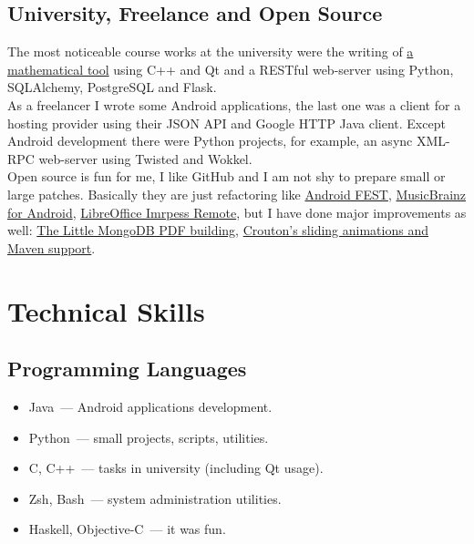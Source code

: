     \subsection*{University, Freelance and Open Source}

      The most noticeable course works at the university were the writing of
      \href{https://github.com/ming13/aequatio}{a mathematical tool}
      using C++ and Qt and a RESTful web-server using Python,
      SQLAlchemy, PostgreSQL and Flask. \\

      As a freelancer I wrote some Android applications, the last one was
      a client for a hosting provider using their JSON API
      and Google HTTP Java client.
      Except Android development there were Python projects, for example,
      an async XML-RPC web-server using Twisted and Wokkel. \\

      Open source is fun for me, I like GitHub and I am not shy to prepare
      small or large patches. Basically they are just refactoring like
      \href{https://github.com/square/fest-android/commits?author=ming13}{Android FEST},
      \href{https://github.com/jdamcd/musicbrainz-android/commits?author=ming13}{MusicBrainz for Android},
      \href{https://gerrit.libreoffice.org/#/q/owner:%22Artur+Dryomov%22+status:closed,n,z}{LibreOffice Imrpess Remote},
      but I have done major improvements as well:
      \href{https://github.com/karlseguin/the-little-mongodb-book/pull/16}{The Little MongoDB PDF building},
      \href{https://github.com/keyboardsurfer/Crouton/pulls/ming13?state=closed}{Crouton’s sliding animations and Maven support}.


  \section*{Technical Skills}

    \subsection*{Programming Languages}

      \begin{itemize}

        \item Java~--- Android applications development.

        \item Python~--- small projects, scripts, utilities.

        \item C, C++~--- tasks in university (including Qt usage).

        \item Zsh, Bash~--- system administration utilities.

        \item Haskell, Objective-C~--- it was fun.

      \end{itemize}

